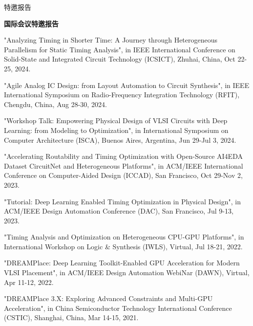 \begin{rSection}{特邀报告}


\textbf{国际会议特邀报告}
        
\begin{description}[font=\normalfont]

\item[{[T11]}]{
"Analyzing Timing in Shorter Time: A Journey through Heterogeneous Parallelism for Static Timing Analysis", in IEEE International Conference on Solid-State and Integrated Circuit Technology (ICSICT), Zhuhai, China, Oct 22-25, 2024. 
}

\item[{[T10]}]{
"Agile Analog IC Design: from Layout Automation to Circuit Synthesis", in IEEE International Symposium on Radio-Frequency Integration Technology (RFIT), Chengdu, China, Aug 28-30, 2024. 
}

\item[{[T9]}]{
"Workshop Talk: Empowering Physical Design of VLSI Circuits with Deep Learning: from Modeling to Optimization", in International Symposium on Computer Architecture (ISCA), Buenos Aires, Argentina, Jun 29-Jul 3, 2024. 
}

\item[{[T8]}]{
"Accelerating Routability and Timing Optimization with Open-Source AI4EDA Dataset CircuitNet and Heterogeneous Platforms", in ACM/IEEE International Conference on Computer-Aided Design (ICCAD), San Francisco, Oct 29-Nov 2, 2023. 
}

\item[{[T7]}]{
"Tutorial: Deep Learning Enabled Timing Optimization in Physical Design", in ACM/IEEE Design Automation Conference (DAC), San Francisco, Jul 9-13, 2023. 
}

\item[{[T6]}]{
"Timing Analysis and Optimization on Heterogeneous CPU-GPU Platforms", in International Workshop on Logic \& Synthesis (IWLS), Virtual, Jul 18-21, 2022. 
}

\item[{[T5]}]{
"DREAMPlace: Deep Learning Toolkit-Enabled GPU Acceleration for Modern VLSI Placement", in ACM/IEEE Design Automation WebiNar (DAWN), Virtual, Apr 11-12, 2022. 
}

\item[{[T4]}]{
"DREAMPlace 3.X: Exploring Advanced Constraints and Multi-GPU Acceleration", in China Semiconductor Technology International Conference (CSTIC), Shanghai, China, Mar 14-15, 2021. 
}


\end{description}
\end{rSection}
